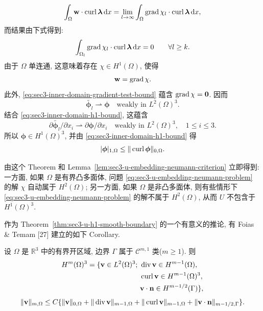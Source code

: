\begin{Proof}
\[
\int_\Omega\mathbf w\cdot\operatorname{curl}\boldsymbol\lambda\,\mathrm{d} x
=\lim_{l\to\infty}\int_\Omega
\operatorname{grad}\chi_l\cdot\operatorname{curl}\boldsymbol\lambda\,\mathrm{d} x,
\]
而结果由下式得到:
\[
\int_{\Omega_l}\operatorname{grad}\chi_l\cdot\operatorname{curl}\boldsymbol\lambda\,\mathrm{d} x=0
\qquad\forall l\ge k.
\]
由于 $\Omega$ 单连通, 这意味着存在 $\chi\in H^1(\Omega)$, 使得
\[
\mathbf w=\operatorname{grad}\chi.
\]
此外, \eqref{eq:sec3-inner-domain-gradient-test-bound} 蕴含
$\operatorname{grad}\chi=\mathbf0$. 因而
\[
\widetilde{\boldsymbol\phi_l}\rightharpoonup\boldsymbol\phi
\quad\text{weakly in }L^2(\Omega)^3.
\]
结合 \eqref{eq:sec3-inner-domain-h1-bound}, 这蕴含
\[
\partial\widetilde{\boldsymbol\phi_l}/\partial x_i
\rightharpoonup\partial\boldsymbol\phi/\partial x_i
\quad\text{weakly in }L^2(\Omega)^3,
\quad1\le i\le3.
\]
所以 $\boldsymbol\phi\in H^1(\Omega)^3$, 并由
\eqref{eq:sec3-inner-domain-h1-bound} 得
\[
|\boldsymbol\phi|_{1,\Omega}
\le\|\operatorname{curl}\boldsymbol\phi\|_{0,\Omega}.
\]
\end{Proof}

由这个 Theorem 和 Lemma~\ref{lem:sec3-u-embedding-neumann-criterion} 立即得到:
一方面, 如果 $\Omega$ 是有界凸多面体, 问题
\eqref{eq:sec3-u-embedding-neumann-problem} 的解 $\chi$ 自动属于 $H^2(\Omega)$;
另一方面, 如果 $\Omega$ 是非凸多面体, 则有些情形下
\eqref{eq:sec3-u-embedding-neumann-problem} 的解不属于 $H^2(\Omega)$,
从而 $U$ 不包含于 $H^1(\Omega)^3$.

作为 Theorem~\ref{thm:sec3-u-h1-smooth-boundary} 的一个有意义的推论,
有 Foias \& Temam [27] 建立的如下 Corollary.

\setcounter{statement}{6}
\begin{Corollary}\label{cor:sec3-hm-div-curl-characterization}
设 $\Omega$ 是 $\mathbb R^3$ 中的有界开区域, 边界 $\Gamma$ 属于
$\mathcal C^{m,1}$ 类($m\ge1$). 则
\begin{equation}\label{eq:sec3-hm-div-curl-characterization}
\begin{aligned}
H^m(\Omega)^3=\{\mathbf v\in L^2(\Omega)^3;\ &\operatorname{div}\mathbf v\in H^{m-1}(\Omega),\\
&\operatorname{curl}\mathbf v\in H^{m-1}(\Omega)^3,\\
&\mathbf v\cdot\mathbf n\in H^{m-1/2}(\Gamma)\},
\end{aligned}
\end{equation}
\begin{equation}\label{eq:sec3-hm-div-curl-estimate}
\|\mathbf v\|_{m,\Omega}\le C\{\|\mathbf v\|_{0,\Omega}
+\|\operatorname{div}\mathbf v\|_{m-1,\Omega}
+\|\operatorname{curl}\mathbf v\|_{m-1,\Omega}
+\|\mathbf v\cdot\mathbf n\|_{m-1/2,\Gamma}\}.
\end{equation}
\end{Corollary}
